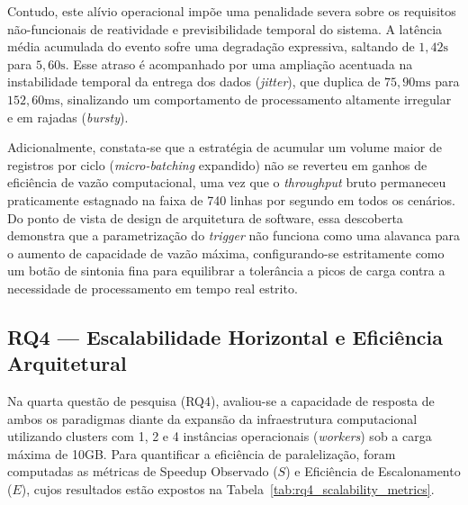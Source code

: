 Contudo, este alívio operacional impõe uma penalidade severa sobre os requisitos não-funcionais de reatividade e previsibilidade temporal do sistema. A latência média acumulada do evento sofre uma degradação expressiva, saltando de $1{,}42\text{s}$ para $5{,}60\text{s}$. Esse atraso é acompanhado por uma ampliação acentuada na instabilidade temporal da entrega dos dados (\textit{jitter}), que duplica de $75{,}90\text{ms}$ para $152{,}60\text{ms}$, sinalizando um comportamento de processamento altamente irregular e em rajadas (\textit{bursty}).

Adicionalmente, constata-se que a estratégia de acumular um volume maior de registros por ciclo (\textit{micro-batching} expandido) não se reverteu em ganhos de eficiência de vazão computacional, uma vez que o \textit{throughput} bruto permaneceu praticamente estagnado na faixa de 740 linhas por segundo em todos os cenários. Do ponto de vista de design de arquitetura de software, essa descoberta demonstra que a parametrização do \textit{trigger} não funciona como uma alavanca para o aumento de capacidade de vazão máxima, configurando-se estritamente como um botão de sintonia fina para equilibrar a tolerância a picos de carga contra a necessidade de processamento em tempo real estrito.

\subsection{RQ4 --- Escalabilidade Horizontal e Eficiência Arquitetural}
Na quarta questão de pesquisa (RQ4), avaliou-se a capacidade de resposta de ambos os paradigmas diante da expansão da infraestrutura computacional utilizando clusters com 1, 2 e 4 instâncias operacionais (\textit{workers}) sob a carga máxima de 10GB. Para quantificar a eficiência de paralelização, foram computadas as métricas de Speedup Observado ($S$) e Eficiência de Escalonamento ($E$), cujos resultados estão expostos na Tabela~\ref{tab:rq4_scalability_metrics}.

